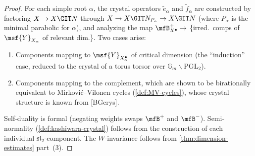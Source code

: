 \begin{proof}
  For each simple root \( \alpha \), the crystal operators \( \tilde{e}_\alpha \) and
  \( \tilde{f}_\alpha \) are constructed by factoring
  \( X \to X \GIT N \) through \( X \to X \GIT N_{P_\alpha} \to X \GIT N \)
  (where \( P_\alpha \) is the minimal parabolic for \( \alpha \)),
  and analyzing the map
  \( \mfB_{X^\bullet}^+ \to \) \{irred.\ comps of \( \msf{Y}_{X_\alpha} \) of relevant dim.\}.
  Two cases arise:
  \begin{enumerate}
    \item Components mapping to \( \msf{Y}_{X_\alpha^\bullet} \) of critical dimension
          (the ``induction'' case, reduced to the crystal of a torus torsor over
          \( \mathbb{G}_m \backslash \mathrm{PGL}_2 \)).
    \item Components mapping to the complement, which are shown to be birationally
          equivalent to Mirković--Vilonen cycles
          (\cref{def:MV-cycles}), whose crystal structure is known from [BGcrys].
  \end{enumerate}
  Self-duality is formal (negating weights swaps \( \mfB^+ \) and \( \mfB^- \)).
  Semi-normality (\cref{def:kashiwara-crystal}) follows from the construction of each
  individual \( \mathfrak{sl}_2 \)-component.
  The \( W \)-invariance follows from \cref{thm:dimension-estimates} part~(3).
\end{proof}

